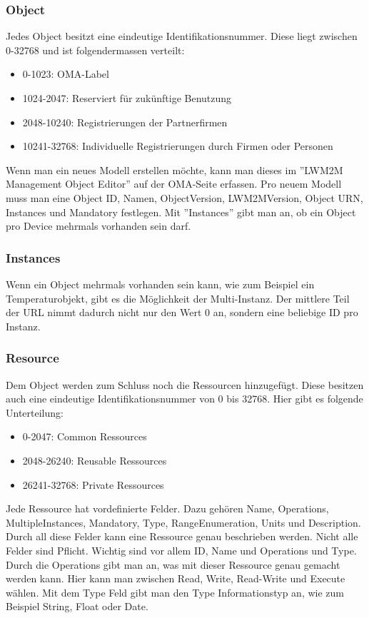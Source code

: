 \subsubsection{Object}
Jedes Object besitzt eine eindeutige Identifikationsnummer. Diese liegt zwischen 0-32768 und ist folgendermassen verteilt:
\begin{itemize}
\item 0-1023: OMA-Label
\item 1024-2047: Reserviert für zukünftige Benutzung
\item 2048-10240: Registrierungen der Partnerfirmen
\item 10241-32768: Individuelle Registrierungen durch Firmen oder Personen
\end{itemize}
Wenn man ein neues Modell erstellen möchte, kann man dieses im ''LWM2M Management Object Editor'' auf der OMA-Seite erfassen. Pro neuem Modell muss man eine Object ID, Namen, ObjectVersion, LWM2MVersion, Object URN, Instances und Mandatory festlegen. Mit ''Instances'' gibt man an, ob ein Object pro Device mehrmals vorhanden sein darf.
\subsubsection{Instances}
Wenn ein Object mehrmals vorhanden sein kann, wie zum Beispiel ein Temperaturobjekt, gibt es die Möglichkeit der Multi-Instanz. Der mittlere Teil der URL nimmt dadurch nicht nur den Wert 0 an, sondern eine beliebige ID pro Instanz.

\subsubsection{Resource}
Dem Object werden zum Schluss noch die Ressourcen hinzugefügt. Diese besitzen auch eine eindeutige Identifikationsnummer von 0 bis 32768. Hier gibt es folgende Unterteilung:
\begin{itemize}
\item 0-2047: Common Ressources
\item 2048-26240: Reusable Ressources
\item 26241-32768: Private Ressources
\end{itemize}
Jede Ressource hat vordefinierte Felder. Dazu gehören Name, Operations, MultipleInstances, Mandatory, Type, RangeEnumeration, Units und Description. Durch all diese Felder kann eine Ressource genau beschrieben werden. Nicht alle Felder sind Pflicht. Wichtig sind vor allem ID, Name und Operations und Type. Durch die Operations gibt man an, was mit dieser Ressource genau gemacht werden kann. Hier kann man zwischen Read, Write, Read-Write und Execute wählen.	Mit dem Type Feld gibt man den Type Informationstyp an, wie zum Beispiel String, Float oder Date.


